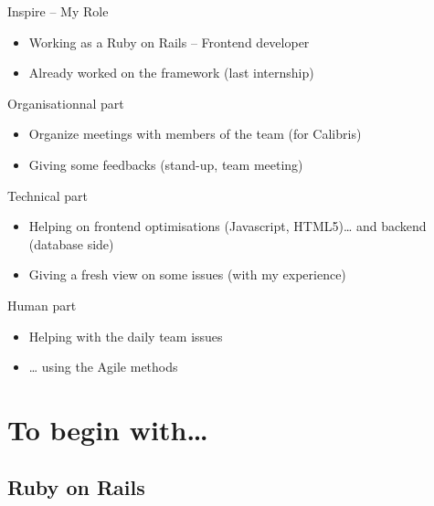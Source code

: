 \documentclass[10pt,a4paper]{beamer}
\begin{document}
\begin{frame}{Inspire -- My Role}

  \begin{itemize}
    \item Working as a Ruby on Rails -- Frontend developer
    \item Already worked on the framework (last internship)
  \end{itemize}
  
  \begin{block}{Organisationnal part}
    \begin{itemize}
      \item Organize meetings with members of the team (for Calibris)
      \item Giving some feedbacks (stand-up, team meeting)
    \end{itemize}
  \end{block}
  
  \begin{block}{Technical part}
    \begin{itemize}
      \item Helping on frontend optimisations (Javascript, HTML5)… and backend (database side)
      \item Giving a fresh view on some issues (with my experience)
    \end{itemize}
  \end{block}
  
  \begin{block}{Human part}
    \begin{itemize}
      \item Helping with the daily team issues
      \item … using the Agile methods
    \end{itemize}
  \end{block}
\end{frame}

\section{To begin with…}

\subsection{Ruby on Rails}
\end{document}
